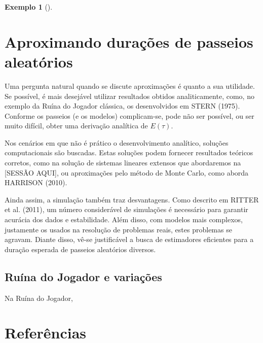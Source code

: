 \documentclass[
  brazilian,
  12pt,
]{article}
\theoremstyle{definition}
\newtheorem{example}{Exemplo}[section]
\theoremstyle{remark}
\begin{document}
\begin{example}[]
\section{Aproximando durações de passeios
aleatórios}\label{aproximando-durauxe7uxf5es-de-passeios-aleatuxf3rios}

Uma pergunta natural quando se discute aproximações é quanto a sua
utilidade. Se possível, é mais desejável utilizar resultados obtidos
analiticamente, como, no exemplo da Ruína do Jogador clássica, os
desenvolvidos em STERN (1975). Conforme os passeios (e os modelos)
complicam-se, pode não ser possível, ou ser muito difícil, obter uma
derivação analítica de \(E(\tau)\).

Nos cenários em que não é prático o desenvolvimento analítico, soluções
computacionais são buscadas. Estas soluções podem fornecer resultados
teóricos corretos, como na solução de sistemas lineares extensos que
abordaremos na {[}SESSÃO AQUI{]}, ou aproximações pelo método de Monte
Carlo, como aborda HARRISON (2010).

Ainda assim, a simulação também traz desvantagens. Como descrito em
RITTER et al. (2011), um número considerável de simulações é necessário
para garantir acurácia dos dados e estabilidade. Além disso, com modelos
mais complexos, justamente os usados na resolução de problemas reais,
estes problemas se agravam. Diante disso, vê-se justificável a busca de
estimadores eficientes para a duração esperada de passeios aleatórios
diversos.

\subsection{Ruína do Jogador e
variações}\label{ruuxedna-do-jogador-e-variauxe7uxf5es}

Na Ruína do Jogador,

\newpage{}

\section{Referências}\label{referuxeancias}

\end{example}
\end{document}

